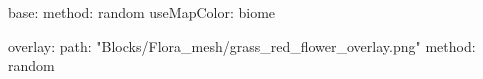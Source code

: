 base:
  method: random
  useMapColor: biome

overlay:
  path: "Blocks/Flora_mesh/grass_red_flower_overlay.png"
  method: random